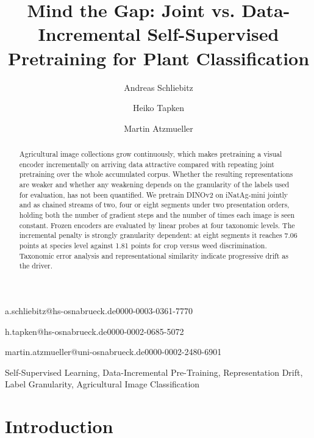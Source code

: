 \documentclass[english]{lni}
\begin{document}
\title{Mind the Gap: Joint vs. Data-Incremental Self-Supervised Pretraining for Plant Classification}

\author[1]{Andreas Schliebitz}{a.schliebitz@hs-osnabrueck.de}{0000-0003-0361-7770}
\author[1]{Heiko Tapken}{h.tapken@hs-osnabrueck.de}{0000-0002-0685-5072}
\author[2]{Martin Atzmueller}{martin.atzmueller@uni-osnabrueck.de}{0000-0002-2480-6901}

\maketitle

\begin{abstract}
Agricultural image collections grow continuously, which makes pretraining a visual encoder incrementally on arriving data attractive compared with repeating joint pretraining over the whole accumulated corpus. Whether the resulting representations are weaker and whether any weakening depends on the granularity of the labels used for evaluation, has not been quantified. We pretrain DINOv2 on iNatAg-mini jointly and as chained streams of two, four or eight segments under two presentation orders, holding both the number of gradient steps and the number of times each image is seen constant. Frozen encoders are evaluated by linear probes at four taxonomic levels. The incremental penalty is strongly granularity dependent: at eight segments it reaches 7.06 points at species level against 1.81 points for crop versus weed discrimination. Taxonomic error analysis and representational similarity indicate progressive drift as the driver.
\end{abstract}

\begin{keywords}
Self-Supervised Learning, Data-Incremental Pre-Training, Representation Drift, Label Granularity, Agricultural Image Classification
\end{keywords}

\section{Introduction}\label{sec:introduction}
\end{document}
